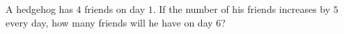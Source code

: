 A hedgehog has $4$ friends on day $1$. If the number of his friends increases by $5$ every day, how many friends will he have on day $6$?
